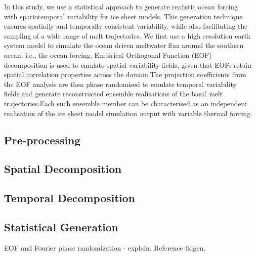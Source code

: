 In this study, we use a statistical approach to generate realistic ocean forcing with spatiotemporal variability for ice sheet models. This generation technique ensures spatially and temporally consistent variability, while also facilitating the sampling of a wide range of melt trajectories. We first use a high resolution earth system model to simulate the ocean driven meltwater flux around the southern ocean, i.e., the ocean forcing. Empirical Orthogonal Function (EOF) decomposition is used to emulate spatial variability fields, given that EOFs retain spatial correlation properties across the domain.The projection coefficients from the EOF analysis are then phase randomised to emulate temporal variability fields and generate reconstructed ensemble realisations of the basal melt trajectories.Each such ensemble member can be characterised as an independent realisation of the ice sheet model simulation output with variable thermal forcing.

\subsection{Pre-processing}
\subsection{Spatial Decomposition}
\subsection{Temporal Decomposition}
\subsection{Statistical Generation}

EOF and Fourier phase randomization - explain. Reference fldgen.

